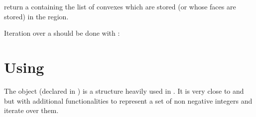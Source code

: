 \documentclass[a4paper,11pt,english]{sphinxmanual}
\begin{document}
\begin{fulllineitems}
\label{\detokenize{userdoc/bmesh:_CPPv4N6getfem11mesh_region5indexEv}}%
\pysigstartmultiline
{}%
\pysigstopmultiline
return a  containing the list of convexes
which are stored (or whose faces are stored) in the region.

\end{fulllineitems}


Iteration over a  should be done with :

\begin{sphinxVerbatim}[commandchars=\\\{\}]
   
     
       
           
\end{sphinxVerbatim}


\section{Using }
\label{\detokenize{userdoc/bmesh:using-dal-bv}}
The object  (declared in ) is a structure
heavily used in . It is very close to  and
 but with additional functionalities to represent a set of
non negative integers and iterate over them.
\end{document}
